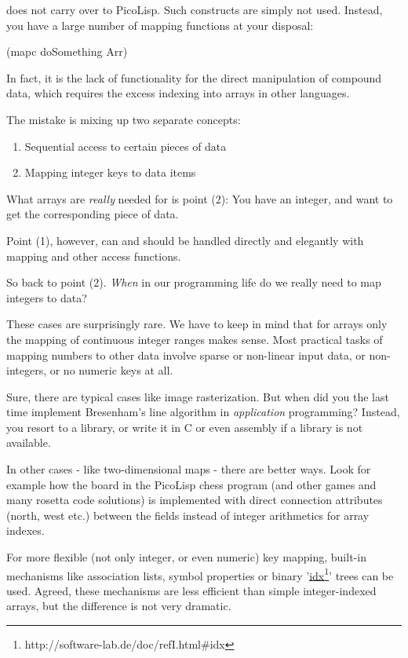 does not carry over to PicoLisp. Such constructs are simply not used. Instead,
you have a large number of mapping functions at your disposal:
\begin{wideverbatim}
   (mapc doSomething Arr)
\end{wideverbatim}

In fact, it is the lack of functionality for the direct manipulation of compound
data, which requires the excess indexing into arrays in other languages.

The mistake is mixing up two separate concepts:
\begin{enumerate}
   \item Sequential access to certain pieces of data
   \item Mapping integer keys to data items
\end{enumerate}
What arrays are \textit{really} needed for is point (2): You have an integer, and want
to get the corresponding piece of data.

Point (1), however, can and should be handled directly and elegantly with
mapping and other access functions.

So back to point (2). \textit{When} in our programming life do we really need to map
integers to data?

These cases are surprisingly rare. We have to keep in mind that for arrays only
the mapping of continuous integer ranges makes sense. Most practical tasks of
mapping numbers to other data involve sparse or non-linear input data, or
non-integers, or no numeric keys at all.

Sure, there are typical cases like image rasterization. But when did you the
last time implement Bresenham's line algorithm in \textit{application} programming?
Instead, you resort to a library, or write it in C or even assembly if a library
is not available.

In other cases - like two-dimensional maps - there are better ways. Look for
example how the board in the PicoLisp chess program (and other games and many
rosetta code solutions) is implemented with direct connection attributes (north,
west etc.) between the fields instead of integer arithmetics for array indexes.

For more flexible (not only integer, or even numeric) key mapping, built-in
mechanisms like association lists, symbol properties or binary
'\underline{idx}\footnote{http://software-lab.de/doc/refI.html\#idx}' trees can be used. Agreed,
these mechanisms are less efficient than simple integer-indexed arrays, but the
difference is not very dramatic.

